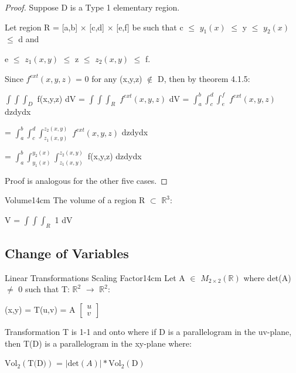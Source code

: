     \begin{proof}
        Suppose D is a Type 1 elementary region.

        Let region R = [a,b] $\times$ [c,d] $\times$ [e,f] be such that
        c $\leq$ $y_1(x)$ $\leq$ y $\leq$ $y_2(x)$ $\leq$ d and
        
        e $\leq$ $z_1(x,y)$ $\leq$ z $\leq$ $z_2(x,y)$ $\leq$ f.

        Since $f^{ext}(x,y,z)$ = 0 for any
        (x,y,z) $\not \in$ D, then by {\color{red} theorem 4.1.5}:

        \hspace{0.5cm}
        $\int \int \int_D$ f(x,y,z) dV
        = $\int \int \int_R$ $f^{ext}(x,y,z)$ dV
        = $\int_a^b \int_c^d \int_e^f$ $f^{ext}(x,y,z)$ dzdydx
        
        \hspace{3.9cm}
        = $\int_a^b \int_c^d \int_{z_1(x,y)}^{z_2(x,y)}$ $f^{ext}(x,y,z)$ dzdydx

        \hspace{3.9cm}
        = $\int_a^b \int_{y_1(x)}^{y_2(x)} \int_{z_1(x,y)}^{z_2(x,y)}$
        f(x,y,z) dzdydx

        Proof is analogous for the other five cases.
    \end{proof}

    \vspace{0.5cm}



    \begin{definition}{Volume}{14cm}
        The {\color{lblue} volume} of a region R $\subset$ $\mathbb{R}^3$:

        \hspace{0.5cm}
        V = $\int \int \int_R$ 1 dV
    \end{definition}

    \newpage





\subsection{ Change of Variables }

    \begin{wtheorem}{Linear Transformations Scaling Factor}{14cm}
        Let A $\in$ $M_{2 \times 2}(\mathbb{R})$ where det(A) $\not =$ 0
        such that T: $\mathbb{R}^2$ $\rightarrow$ $\mathbb{R}^2$:

        \hspace{0.5cm}
        (x,y) = T(u,v) = A
        $
        \begin{bmatrix}
            u \\
            v
        \end{bmatrix}
        $

        Transformation T is 1-1 and onto where if D is a parallelogram in the
        uv-plane, then T(D) is a parallelogram in the xy-plane where:

        \hspace{0.5cm}
        $\text{Vol}_2(\text{T(D)})$ = $|\text{det}(A)| * \text{Vol}_2(\text{D})$
    \end{wtheorem}

